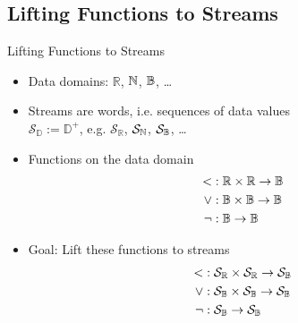 \subsection{Lifting Functions to Streams}

\begin{frame}{Lifting Functions to Streams}
  \begin{itemize}
    \item Data domains: $\mathbb R$, $\mathbb{N}$, $\mathbb{B}$, \ldots
    \item Streams are words, i.e. sequences of data values\\
      $\mathcal S_{\mathbb D} := {\mathbb D}^+$, e.g. $\mathcal S_{\mathbb R}$, $\mathcal S_{\mathbb{N}}$, $\mathcal S_{\mathbb{B}}$, \ldots
    \item Functions on the data domain
      \begin{align}
        \operatorname{<}&: \mathbb R \times \mathbb R \to \mathbb{B}\\
        \operatorname{\vee}&: \mathbb{B} \times \mathbb{B} \to \mathbb{B}\\
        \operatorname{\neg}&: \mathbb{B} \to \mathbb{B}
      \end{align}
    \item Goal: Lift these functions to streams
      \begin{align}
        \operatorname{<}&: \mathcal S_{\mathbb R} \times \mathcal S_{\mathbb R} \to \mathcal S_{\mathbb{B}}\\
        \operatorname{\vee}&: \mathcal S_{\mathbb{B}} \times \mathcal S_{\mathbb{B}} \to \mathcal S_{\mathbb{B}}\\
        \operatorname{\neg}&: \mathcal S_{\mathbb{B}} \to \mathcal S_{\mathbb{B}}
      \end{align}
  \end{itemize}
\end{frame}

